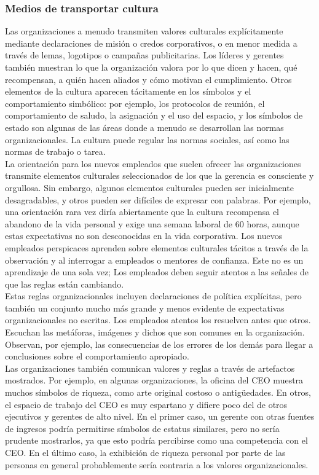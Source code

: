 \documentclass[10pt]{book}
\begin{document}
\subsubsection{Medios de transportar cultura}
Las organizaciones a menudo transmiten valores culturales explícitamente mediante declaraciones de misión o credos corporativos, o en menor medida a través de lemas, logotipos o campañas publicitarias. Los líderes y gerentes también muestran lo que la organización valora por lo que dicen y hacen, qué recompensan, a quién hacen aliados y cómo motivan el cumplimiento. Otros elementos de la cultura aparecen tácitamente en los símbolos y el comportamiento simbólico: por ejemplo, los protocolos de reunión, el comportamiento de saludo, la asignación y el uso del espacio, y los símbolos de estado son algunas de las áreas donde a menudo se desarrollan las normas organizacionales. La cultura puede regular las normas sociales, así como las normas de trabajo o tarea.\\
La orientación para los nuevos empleados que suelen ofrecer las organizaciones transmite elementos culturales seleccionados de los que la gerencia es consciente y orgullosa. Sin embargo, algunos elementos culturales pueden ser inicialmente desagradables, y otros pueden ser difíciles de expresar con palabras. Por ejemplo, una orientación rara vez diría abiertamente que la cultura recompensa el abandono de la vida personal y exige una semana laboral de 60 horas, aunque estas expectativas no son desconocidas en la vida corporativa. Los nuevos empleados perspicaces aprenden sobre elementos culturales tácitos a través de la observación y al interrogar a empleados o mentores de confianza. Este no es un aprendizaje de una sola vez; Los empleados deben seguir atentos a las señales de que las reglas están cambiando.\\
Estas reglas organizacionales incluyen declaraciones de política explícitas, pero también un conjunto mucho más grande y menos evidente de expectativas organizacionales no escritas. Los empleados atentos los resuelven antes que otros. Escuchan las metáforas, imágenes y dichos que son comunes en la organización. Observan, por ejemplo, las consecuencias de los errores de los demás para llegar a conclusiones sobre el comportamiento apropiado.\\
Las organizaciones también comunican valores y reglas a través de artefactos mostrados. Por ejemplo, en algunas organizaciones, la oficina del CEO muestra muchos símbolos de riqueza, como arte original costoso o antigüedades. En otros, el espacio de trabajo del CEO es muy espartano y difiere poco del de otros ejecutivos y gerentes de alto nivel. En el primer caso, un gerente con otras fuentes de ingresos podría permitirse símbolos de estatus similares, pero no sería prudente mostrarlos, ya que esto podría percibirse como una competencia con el CEO. En el último caso, la exhibición de riqueza personal por parte de las personas en general probablemente sería contraria a los valores organizacionales.\\
\end{document}
